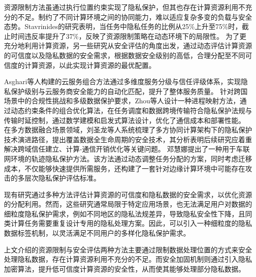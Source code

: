 资源限制方法虽通过执行位置约束实现了隐私保护，但其也存在计算资源利用不充分的不足。制约了不同计算环境之间的协同能力，难以适应复杂多变的负载与安全态势。Stavrinides\cite{stavrinidesDynamicSchedulingBagsoftasks2021}的研究表明，当任务中隐私任务的比例从25\%上升至75\%时，截止时间违反率提升了37\%，反映了资源限制策略在动态环境下的局限性。
为了更充分地利用计算资源，另一些研究从安全评估的角度出发，通过动态评估计算资源的可信度以及隐私数据的安全需求\cite{zhouPrivacyRegulationAware2019, YuYiHanJiyuduocengmohuzonghepinggudeyinsibaohuxiaoguopinggufangfa2020, asghariPrivacyawareCloudService2022, singhSchedulingRealTimeSecurity2021, dengYidongBianyuanJisuan2023, zhuTaskSchedulingMultiCloud2021}，根据数据安全级别的高低，合理分配至不同可信度的计算资源，以此实现计算资源的最优配置。

Asghari等人\cite{asghariPrivacyawareCloudService2022}构建的云服务组合方法通过多维度服务分级与信任评级体系，实现隐私保护级别与云服务商安全能力的自动化匹配，提升了整体服务质量。
针对跨国场景中的合规性挑战和多级数据保护要求，Zhou等人\cite{zhouPrivacyRegulationAware2019}设计一种进程映射方法，通过动态约束条件的组合优化算法，在任务调度和数据跨境传输符合隐私保护法规与传输时延控制，通过数学建模和启发式算法设计，优化了通信成本和部署性能。
在多方数据融合场景领域，刘圣龙等人\cite{LiuShengLongMianxiangduofangshujuronghefenxideyinsijisuanjishuzongshu2024}系统梳理了多方协同计算架构下的隐私保护技术演进路径，提出覆盖数据全生命周期的安全技术，其分析表明后续研究应着重解决跨域信任建立、计算-通信开销优化等关键问题。
邓慧娜\cite{dengCheLianwangBianyuan2023}提出了一种用于车联网环境的轨迹隐私保护方法。该方法通过动态调整任务分配的方案，同时考虑迁移成本，不仅能够快速提供所需服务，还构建了一套针对边缘计算环境中可能存在攻击的多层次隐私保护评估标准。

现有研究通过多种方法评估计算资源的可信度和隐私数据的安全需求，以优化资源的分配利用。然而，这些研究通常局限于特定应用场景，也无法满足用户对数据的细粒度隐私保护需求\cite{liSurveyPrivacypreservingOffloading2022}，例如不同地区的隐私法规差异，导致隐私安全性下降，且同类计算任务需要重复设计专用的隐私处理方案。因此，可以引入一种细粒度的隐私数据标签机制，以灵活满足不同用户的多样化隐私保护需求。

上文介绍的资源限制与安全评估两种方法主要通过限制数据处理位置的方式来安全处理隐私数据，存在计算资源利用不充分的不足。而安全加固机制则通过引入隐私加密算法，提升低可信度计算资源的安全性\cite{leiHunheYunHuanjing2023, wangSecurityawareTaskScheduling2021, chenSchedulingWorkflowsSecuritySensitive2017, budatiSecureMultiLevelPrivacyProtection2023, sonPrivacyProtectionBased2020, balJointResourceAllocation2022}，从而使其能够处理部分隐私数据。

